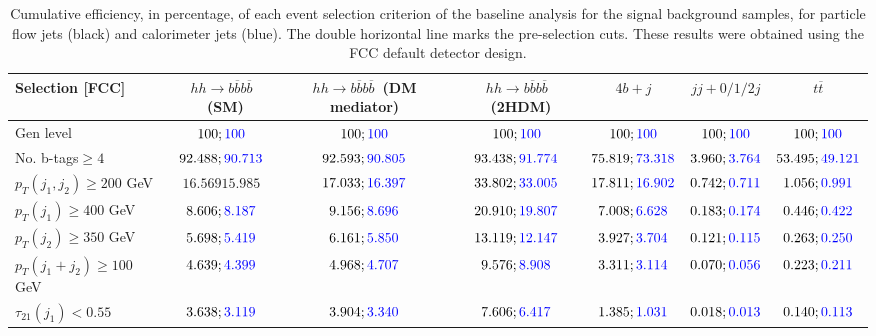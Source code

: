 \begin{landscape}
		\begin{table}
			\centering
			\caption{Cumulative efficiency, in percentage, of each event selection criterion of the baseline analysis for the signal background samples, for particle flow jets (black) and calorimeter jets (blue). The double horizontal line marks the pre-selection cuts. These results were obtained using the FCC default detector design.}
			\begin{tabular}{lcccccc}
				\toprule 
				\textbf{Selection [FCC]} & $hh\rightarrow b\overline{b}b\overline{b}$~(SM) & $hh\rightarrow b\overline{b}b\overline{b}$~(DM mediator) & $hh\rightarrow b\overline{b}b\overline{b}$~(2HDM) & $4b+j$  & $jj+0/1/2 j$ & $t\overline{t}$ \\
				\midrule
				Gen level & $100;\textcolor{blue}{100}$ & $100;\textcolor{blue}{100}$ &$100;\textcolor{blue}{100}$& $100;\textcolor{blue}{100}$& $100;\textcolor{blue}{100}$& $100;\textcolor{blue}{100}$ \\
				\rowcolor{black!7}No. b-tags$\geq 4$&$92.488;\textcolor{blue}{90.713}$&$92.593;\textcolor{blue}{90.805}$&$93.438;\textcolor{blue}{91.774}$&$75.819;\textcolor{blue}{73.318}$&$3.960;\textcolor{blue}{3.764}$&$53.495;\textcolor{blue}{49.121}$\\
				$p_T(j_1,j_2)\geq200$ GeV & $16.569{15.985}$ & $17.033;\textcolor{blue}{16.397}$&$33.802;\textcolor{blue}{33.005}$ &$17.811;\textcolor{blue}{16.902}$&$0.742;\textcolor{blue}{0.711}$&$1.056;\textcolor{blue}{0.991}$\\
				\midrule \midrule
				\rowcolor{black!7}$p_T(j_1)\geq 400$ GeV & $8.606;\textcolor{blue}{8.187}$ &$9.156;\textcolor{blue}{8.696}$  &$20.910;\textcolor{blue}{19.807}$&$7.008;\textcolor{blue}{6.628}$&$0.183;\textcolor{blue}{0.174}$&$0.446;\textcolor{blue}{0.422}$\\ 
				$p_T(j_2)\geq 350$ GeV & $5.698;\textcolor{blue}{5.419}$& $6.161;\textcolor{blue}{5.850}$&$13.119;\textcolor{blue}{12.147}$&$3.927;\textcolor{blue}{3.704}$&$0.121;\textcolor{blue}{0.115}$&$0.263;\textcolor{blue}{0.250}$\\
				\rowcolor{black!7}$p_T(j_1+j_2)\geq 100$ GeV &$4.639;\textcolor{blue}{4.399}$ & $4.968;\textcolor{blue}{4.707}$ &$9.576;\textcolor{blue}{8.908}$&$3.311;\textcolor{blue}{3.114}$&$0.070;\textcolor{blue}{0.056}$&$0.223;\textcolor{blue}{0.211}$\\
				$\tau_{21}(j_1)<0.55$ & $3.638;\textcolor{blue}{3.119}$& $3.904;\textcolor{blue}{3.340}$&$7.606;\textcolor{blue}{6.417}$&$1.385;\textcolor{blue}{1.031}$&$0.018;\textcolor{blue}{0.013}$&$0.140;\textcolor{blue}{0.113}$\\

\end{tabular}
\end{table}
\end{landscape}
